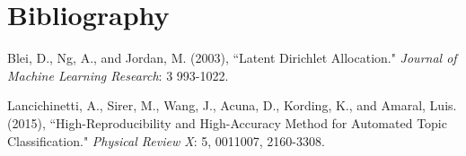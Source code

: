 \documentclass[12pt,times]{elsarticle}
\begin{document}
\newpage
\section{Bibliography}
\begin{thebibliography}{4}
		
	Blei, D., Ng, A., and Jordan, M.  (2003),
	``Latent Dirichlet Allocation."
	\textit{Journal of Machine Learning Research}: 3 993-1022.
	
	Lancichinetti, A., Sirer, M., Wang, J., Acuna, D., Kording, K., and Amaral, Luis. (2015),
	``High-Reproducibility and High-Accuracy Method for Automated Topic Classification."
	\textit{Physical Review X}: 5, 0011007, 2160-3308.
	
\end{thebibliography}
\end{document}
